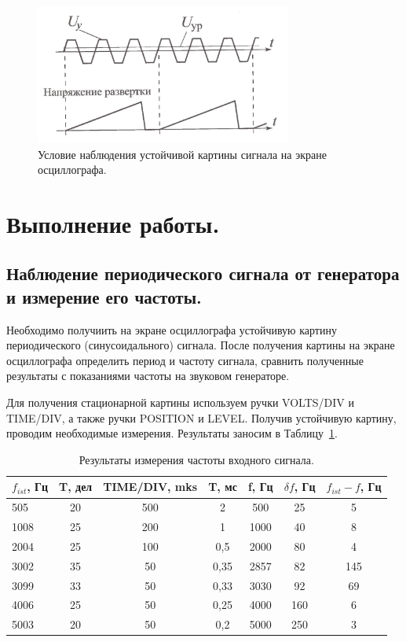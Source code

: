 \documentclass[12pt,a4paper]{article}
\begin{document}
	\begin{figure}[h]
		\begin{center}
			\includegraphics[width = 0.75\textwidth]{sinchronization}
			\caption{Условие наблюдения устойчивой картины сигнала на экране осциллографа.}
			\label{fig:sinchronization}
		\end{center}
	\end{figure}
\newpage
\section{Выполнение работы.}
	\subsection{Наблюдение периодического сигнала от генератора и измерение его частоты.}
	

	Необходимо получиить на экране осциллографа устойчивую картину периодического (синусоидального) сигнала. После получения картины на экране осциллографа определить период и частоту сигнала, сравнить полученные результаты с показаниями частоты на звуковом генераторе.
	
	Для получения стационарной картины используем ручки VOLTS/DIV и TIME/DIV, а также ручки POSITION и LEVEL. Получив устойчивую картину, проводим необходимые измерения. Результаты заносим в Таблицу~\ref{tab:frequency}.
		
	\begin{table}[h]
		\begin{center}
			\begin{tabular}{|l|c|c|c|c|c|c|}
				\hline
				$f_{ist}$, Гц & T, дел & TIME/DIV, mks & T, мс & f, Гц & $\delta f$, Гц & $f_{ist} - f$, Гц \\ \hline
				505 & 20 & 500  & 2     & 500   & 25    & 5  \\ \hline
				1008 & 25  & 200  & 1     & 1000  & 40    & 8 \\ \hline
				2004 & 25  & 100  & 0,5   & 2000  & 80    & 4 \\ \hline
				3002 & 35  & 50   & 0,35  & 2857  & 82    & 145 \\ \hline
				3099 & 33  & 50   & 0,33  & 3030  & 92    & 69 \\ \hline
				4006 & 25  & 50   & 0,25  & 4000  & 160    & 6 \\ \hline
				5003 & 20  & 50   & 0,2   & 5000  & 250    & 3 \\ \hline	
			\end{tabular}
			\caption{Результаты измерения частоты входного сигнала.}
			\label{tab:frequency}
		\end{center}
	\end{table}
	
\end{document}
